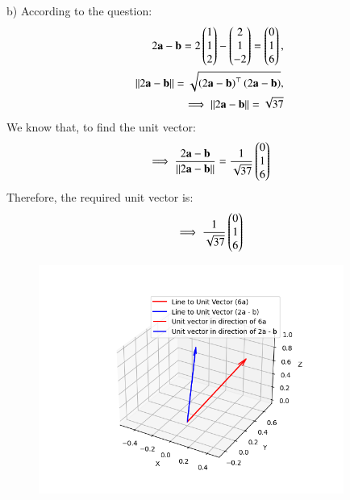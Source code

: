 \documentclass[journal]{IEEEtran}
\begin{document}
\begin{enumerate}
b) According to the question:
\begin{align}
    2\mathbf{a}-\mathbf{b} = 2\begin{pmatrix}1\\1\\2\end{pmatrix}-\begin{pmatrix}2\\1\\-2\end{pmatrix} = \begin{pmatrix}0\\1\\6\end{pmatrix},\\
    \left\vert\left\vert2\mathbf{a}-\mathbf{b}\right\vert\right\vert = \sqrt{{\left(2\mathbf{a}-\mathbf{b}\right)^\top\left(2\mathbf{a}-\mathbf{b}\right)}},\\
    \implies \left\vert\left\vert2\mathbf{a}-\mathbf{b}\right\vert\right\vert = \sqrt{37}
\end{align}
We know that, to find the unit vector:
\begin{align}
    \implies \frac{2\mathbf{a}-\mathbf{b}}{\left\vert\left\vert2\mathbf{a}-\mathbf{b}\right\vert\right\vert} = \frac{1}{\sqrt{37}}\begin{pmatrix}0\\1\\6\end{pmatrix}
\end{align}
Therefore, the required unit vector is:
\begin{align}
    \implies \frac{1}{\sqrt{37}}\begin{pmatrix}0\\1\\6\end{pmatrix}
\end{align}
\begin{figure}[htp]
    \centering
    \includegraphics[width=10cm]{figs/figure.png}
    \label{fig:figure}
\end{figure}
\end{enumerate}
\end{document}
